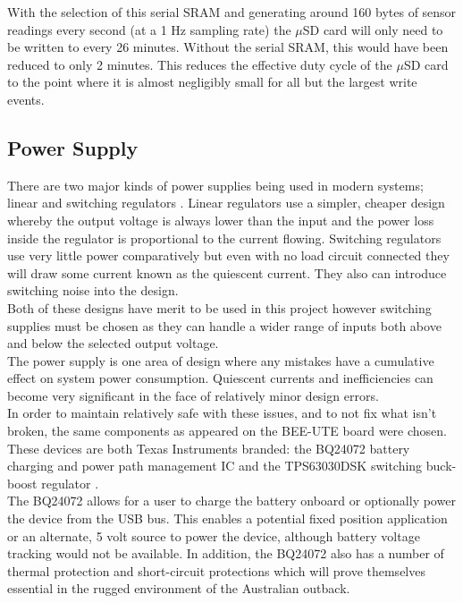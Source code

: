 \documentclass[12pt,openany,a4paper]{book}
\begin{document}
		With the selection of this serial SRAM and generating around 160 bytes of sensor readings every second (at a 1 Hz sampling rate) the $\mu$SD card will only need to be written to every 26 minutes. Without the serial SRAM, this would have been reduced to only 2 minutes. This reduces the effective duty cycle of the $\mu$SD card to the point where it is almost negligibly small for all but the largest write events.
		
		\subsection{Power Supply}

		There are two major kinds of power supplies being used in modern systems; linear and switching regulators \cite{TI2011}. Linear regulators use a simpler, cheaper design whereby the output voltage is always lower than the input and the power loss inside the regulator is proportional to the current flowing. Switching regulators use very little power comparatively but even with no load circuit connected they will draw some current known as the quiescent current. They also can introduce switching noise into the design. \\
		
		Both of these designs have merit to be used in this project however switching supplies must be chosen as they can handle a wider range of inputs both above and below the selected output voltage. \\
					
		The power supply is one area of design where any mistakes have a cumulative effect on system power consumption. Quiescent currents and inefficiencies can become very significant in the face of relatively minor design errors. \\
		
		In order to maintain relatively safe with these issues, and to not fix what isn't broken, the same components as appeared on the BEE-UTE board were chosen. These devices are both Texas Instruments branded: the BQ24072 battery charging and power path management IC \cite{TIUSB} and the TPS63030DSK switching buck-boost regulator \cite{TIBUCK}. \\
		
		The BQ24072 allows for a user to charge the battery onboard or optionally power the device from the USB bus. This enables a potential fixed position application or an alternate, 5 volt source to power the device, although battery voltage tracking would not be available. In addition, the BQ24072 also has a number of thermal protection and short-circuit protections which will prove themselves essential in the rugged environment of the Australian outback. \\%
		
\end{document}
